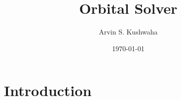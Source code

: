 \documentclass[11pt]{article}
\title{Orbital Solver}
\author{Arvin S. Kushwaha}
\date{\today}
\begin{document}
    \maketitle
    \newpage

    \tableofcontents
    \newpage

    \section{Introduction}
    

    \newpage
    
    
\end{document}
